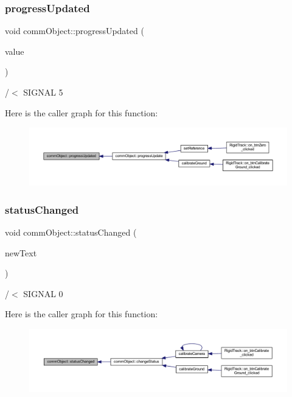 \subsubsection{\texorpdfstring{progress\+Updated}{progressUpdated}}
{\footnotesize\ttfamily void comm\+Object\+::progress\+Updated (\begin{DoxyParamCaption}\item[{int}]{value }\end{DoxyParamCaption})\hspace{0.3cm}{\ttfamily [signal]}}



/$<$ S\+I\+G\+N\+AL 5 

Here is the caller graph for this function\+:
\nopagebreak
\begin{figure}[H]
\begin{center}
\leavevmode
\includegraphics[width=350pt]{classcomm_object_a6039d306f25a6b46c78942edf9cee662_icgraph}
\end{center}
\end{figure}
\mbox{\label{classcomm_object_adccf5b5946d35d5cf6d76f367f93e335}} 
\subsubsection{\texorpdfstring{status\+Changed}{statusChanged}}
{\footnotesize\ttfamily void comm\+Object\+::status\+Changed (\begin{DoxyParamCaption}\item[{Q\+String}]{new\+Text }\end{DoxyParamCaption})\hspace{0.3cm}{\ttfamily [signal]}}



/$<$ S\+I\+G\+N\+AL 0 

Here is the caller graph for this function\+:
\nopagebreak
\begin{figure}[H]
\begin{center}
\leavevmode
\includegraphics[width=350pt]{classcomm_object_adccf5b5946d35d5cf6d76f367f93e335_icgraph}
\end{center}
\end{figure}


